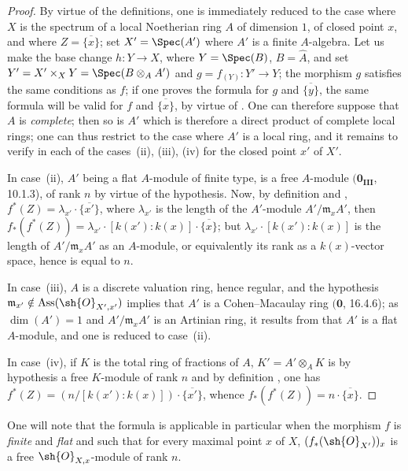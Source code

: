 \begin{proof}
By virtue of the definitions, one is immediately reduced to the case where $X$ is the spectrum of a local Noetherian ring $A$ of dimension $1$, of closed point $x$, and where $Z=\overline{\{x\}}$;
set $X'=\Spec(A')$ where $A'$ is a finite $A$-algebra.
Let us make the base change $h:Y\to X$, where $Y=\Spec(B)$, $B=\hat{A}$, and set $Y'=X'\times_X Y=\Spec(B\otimes_A A')$ and $g=f_{(Y)}:Y'\to Y$;
the morphism $g$ satisfies the same conditions as $f$;
if one proves the formula  for $g$ and $\overline{\{y\}}$, the same formula will be valid for $f$ and $\overline{\{x\}}$, by virtue of .
One can therefore suppose that $A$ is \emph{complete};
then so is $A'$ which is therefore a direct product of complete local rings;
one can thus restrict to the case where $A'$ is a local ring, and it remains to verify  in each of the cases~(ii), (iii), (iv) for the closed point $x'$ of $X'$.


In case~(ii), $A'$ being a flat $A$-module of finite type, is a free $A$-module $(\mathbf{0_{III}}$, 10.1.3), of rank $n$ by virtue of the hypothesis.
Now, by definition  and , $f^*(Z)=\lambda_{x'}\cdot\overline{\{x'\}}$, where $\lambda_{x'}$ is the length of the $A'$-module $A'/\mathfrak{m}_x A'$, then $f_*(f^*(Z))=\lambda_{x'}\cdot[k(x'):k(x)]\cdot\overline{\{x\}}$;
but $\lambda_{x'}\cdot[k(x'):k(x)]$ is the length of $A'/\mathfrak{m}_x A'$ as an $A$-module, or equivalently its rank as a $k(x)$-vector space, hence is equal to $n$.

In case~(iii), $A$ is a discrete valuation ring, hence regular, and the hypothesis $\mathfrak{m}_{x'}\notin\operatorname{Ass}(\sh{O}_{X',x'})$ implies that $A'$ is a Cohen--Macaulay ring $(\mathbf{0}$, 16.4.6);
as $\dim(A')=1$ and $A'/\mathfrak{m}_x A'$ is an Artinian ring, it results from  that $A'$ is a flat $A$-module, and one is reduced to case~(ii).

In case~(iv), if $K$ is the total ring of fractions of $A$, $K'=A'\otimes_A K$ is by hypothesis a free $K$-module of rank $n$ and by definition , one has $f^*(Z)=(n/[k(x'):k(x)])\cdot\overline{\{x'\}}$, whence $f_*(f^*(Z))=n\cdot\overline{\{x\}}$.
\end{proof}

One will note that the formula  is applicable in particular when the morphism $f$ is \emph{finite} and \emph{flat} and such that for every maximal point $x$ of $X$, $(f_*(\sh{O}_{X'}))_x$ is a free $\sh{O}_{X,x}$-module of rank $n$.

